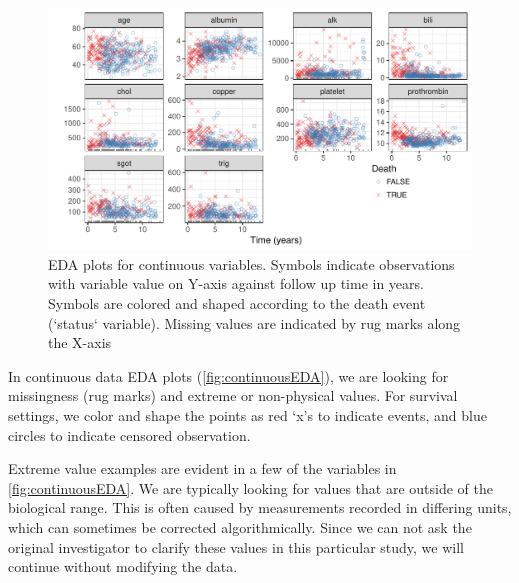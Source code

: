 \documentclass[article, nojss]{jss}
\begin{document}
\begin{Schunk}
\begin{figure}[!htb]

{\centering \includegraphics{rfs-continuousEDA-1}

}

\caption[EDA plots for continuous variables]{EDA plots for continuous variables. Symbols indicate observations with variable value on Y-axis against follow up time in years. Symbols are colored and shaped according to the death event  (`status` variable). Missing values are indicated by rug marks along the X-axis}\label{fig:continuousEDA}
\end{figure}
\end{Schunk}

In continuous data EDA plots (\autoref{fig:continuousEDA}), we are
looking for missingness (rug marks) and extreme or non-physical values.
For survival settings, we color and shape the points as red `x's to
indicate events, and blue circles to indicate censored observation.

Extreme value examples are evident in a few of the variables in
\autoref{fig:continuousEDA}. We are typically looking for values that
are outside of the biological range. This is often caused by
measurements recorded in differing units, which can sometimes be
corrected algorithmically. Since we can not ask the original
investigator to clarify these values in this particular study, we will
continue without modifying the data.
\end{document}
